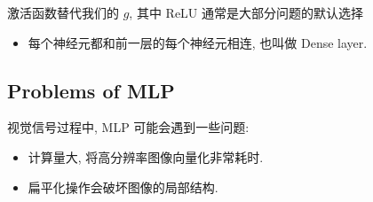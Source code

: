 \documentclass[lang=cn,10pt,green]{elegantbook}
\begin{document}
\begin{note}
激活函数替代我们的 $g$, 其中 ReLU 通常是大部分问题的默认选择
\end{note}

\begin{definition}
    \begin{itemize}
        \item 每个神经元都和前一层的每个神经元相连, 也叫做 Dense layer.
    \end{itemize}
\end{definition}

\subsection{Problems of MLP}
视觉信号过程中, MLP 可能会遇到一些问题:
\begin{itemize}
    \item 计算量大, 将高分辨率图像向量化非常耗时.
    \item 扁平化操作会破坏图像的局部结构.
\end{itemize}

\clearpage

\printbibliography[heading=bibintoc, title=\ebibname]
\end{document}
